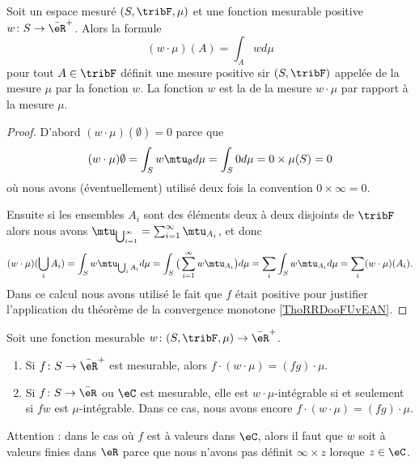 \begin{propositionDef}\label{PropooVXPMooGSkyBo}
    Soit un espace mesuré \( (S,\tribF,\mu)\) et une fonction mesurable positive \( w\colon S\to \bar\eR^+\). Alors la formule
    \begin{equation}
        (w\cdot \mu)(A)=\int_Awd\mu
    \end{equation}
    pour tout \( A\in \tribF\) définit une mesure positive sir \( (S,\tribF)\) appelée  de la mesure \( \mu\) par la fonction \( w\). La fonction \( w\) est la  de la mesure \( w\cdot \mu\) par rapport à la mesure \( \mu\).
\end{propositionDef}

\begin{proof}
    D'abord \( (w\cdot \mu)(\emptyset)=0\) parce que 
    \begin{equation}
        (w\cdot \mu)\emptyset=\int_Sw\mtu_{\emptyset}d\mu=\int_S0d\mu=0\times \mu(S)=0
    \end{equation}
    où nous avons (éventuellement) utilisé deux fois la convention \( 0\times \infty=0\).


    Ensuite si les ensembles \( A_i\) sont des éléments deux à deux disjoints de \( \tribF\) alors nous avons \( \mtu_{\bigcup_{i=1}^{\infty}}=\sum_{i=1}^{\infty}\mtu_{A_i}\), et donc
    \begin{equation}
        (w\cdot \mu)(\bigcup_iA_i)=\int_Sw\mtu_{\bigcup_iA_i}d\mu=\int_S\big( \sum_{i=1}^{\infty}w\mtu_{A_i} \big)d\mu=\sum_i\int_Sw\mtu_{A_i}d\mu=\sum_i(w\cdot\mu)(A_i).
    \end{equation}
    Dans ce calcul nous avons utilisé le fait que \( f\) était positive pour justifier l'application du théorème de la convergence monotone \ref{ThoRRDooFUvEAN}.
\end{proof}

\begin{proposition}  \label{PropooJMWAooDzfpmB}
    Soit une fonction mesurable \( w\colon (S,\tribF,\mu)\to \bar \eR^+\).
    \begin{enumerate}
        \item
            Si $f\colon S\to \bar\eR^+$ est mesurable, alors \( f\cdot(w\cdot \mu)=(fg)\cdot \mu\).
        \item
            Si \( f\colon S\to \bar \eR\) ou \( \eC\) est mesurable, elle est \( w\cdot\mu\)-intégrable si et seulement si \( fw\) est \( \mu\)-intégrable. Dans ce cas, nous avons encore \( f\cdot(w\cdot \mu)=(fg)\cdot\mu\).
    \end{enumerate}
    Attention : dans le cas où \( f\) est à valeurs dans \( \eC\), alors il faut que \( w\) soit à valeurs finies dans \( \eR\) parce que nous n'avons pas définit \( \infty\times z\) lorsque \( z\in \eC\).
\end{proposition}

